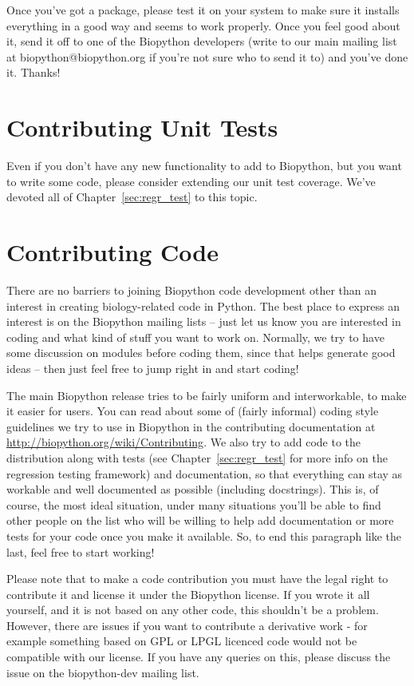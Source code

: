 \documentclass{report}
\begin{document}
Once you've got a package, please test it on your system to make sure it installs everything in a good way and seems to work properly. Once you feel good about it, send it off to one of the Biopython developers (write to our main mailing list at biopython@biopython.org if you're not sure who to send it to) and you've done it. Thanks!

\section{Contributing Unit Tests}

Even if you don't have any new functionality to add to Biopython, but you want to write some code, please
consider extending our unit test coverage.  We've devoted all of Chapter~\ref{sec:regr_test} to this topic.

\section{Contributing Code}

There are no barriers to joining Biopython code development other
than an interest in creating biology-related code in Python. The
best place to express an interest is on the Biopython mailing lists
-- just let us know you are interested in coding and what kind of
stuff you want to work on. Normally, we try to have some discussion
on modules before coding them, since that helps generate good ideas
-- then just feel free to jump right in and start coding!

The main Biopython release tries to be fairly uniform and interworkable,
to make it easier for users. You can read about some of (fairly
informal) coding style guidelines we try to use in Biopython in the
contributing documentation at
\url{http://biopython.org/wiki/Contributing}. We also try to add code to the distribution along with tests (see Chapter~\ref{sec:regr_test} for more info on the regression testing framework) and documentation, so that everything can stay as workable and well documented as possible (including docstrings). This is, of course, the most ideal situation, under many situations you'll be able to find other people on the list who will be willing to help add documentation or more tests for your code once you make it available. So, to end this paragraph like the last, feel free to start working!

Please note that to make a code contribution you must have the legal right to contribute it and license it under the Biopython license.  If you wrote it all yourself, and it is not based on any other code, this shouldn't be a problem.  However, there are issues if you want to contribute a derivative work - for example something based on GPL or LPGL licenced code would not be compatible with our license.  If you have any queries on this, please discuss the issue on the biopython-dev mailing list.
\end{document}
